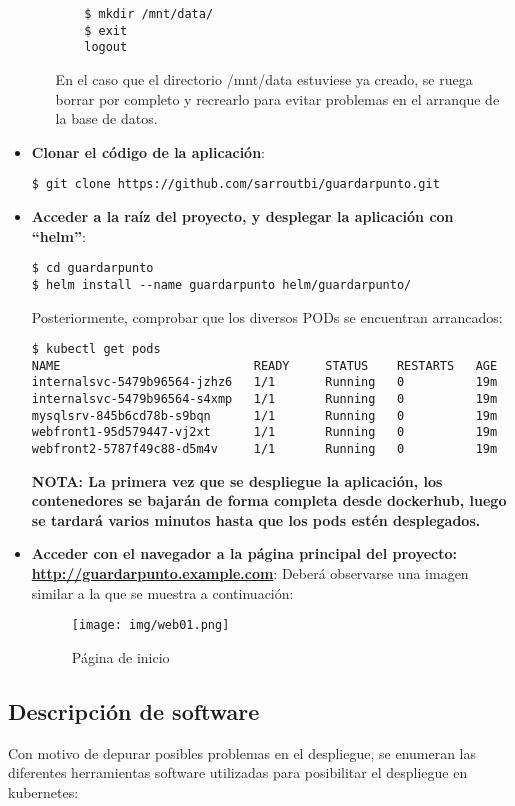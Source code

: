 \documentclass[12pt,spanish]{article}
\begin{document}
\begin{itemize}
\begin{itemize}
\begin{verbatim}
    $ mkdir /mnt/data/
    $ exit
    logout
  \end{verbatim}
  En el caso que el directorio /mnt/data estuviese ya creado, se ruega borrar por completo y recrearlo para evitar problemas en el arranque de la base de datos.
  \end{itemize}
\item{\textbf{Clonar el código de la aplicación}}:
\begin{verbatim}
$ git clone https://github.com/sarroutbi/guardarpunto.git
\end{verbatim}
\item{\textbf{Acceder a la raíz del proyecto, y desplegar la aplicación con ``helm''}}:
\begin{verbatim}
$ cd guardarpunto
$ helm install --name guardarpunto helm/guardarpunto/
\end{verbatim}
Posteriormente, comprobar que los diversos PODs se encuentran arrancados:
\begin{verbatim}
$ kubectl get pods
NAME                           READY     STATUS    RESTARTS   AGE
internalsvc-5479b96564-jzhz6   1/1       Running   0          19m
internalsvc-5479b96564-s4xmp   1/1       Running   0          19m
mysqlsrv-845b6cd78b-s9bqn      1/1       Running   0          19m
webfront1-95d579447-vj2xt      1/1       Running   0          19m
webfront2-5787f49c88-d5m4v     1/1       Running   0          19m
\end{verbatim}
\textbf{NOTA: La primera vez que se despliegue la aplicación, los contenedores se bajarán de forma completa desde dockerhub, luego se tardará varios minutos hasta que los pods estén desplegados.}
\item{\textbf{Acceder con el navegador a la página principal del proyecto: \url{http://guardarpunto.example.com}}}:
Deberá observarse una imagen similar a la que se muestra a continuación:
\begin{center}
 \begin{figure}[H]
 \begin{center}
   \texttt{[image: img/web01.png]}
   \caption{Página de inicio}
   \label{fig:initpage00}
 \end{center}
 \end{figure}
\end{center}

\end{itemize}

\subsection{Descripción de software}
Con motivo de depurar posibles problemas en el despliegue, se enumeran las diferentes herramientas software utilizadas para posibilitar el despliegue en kubernetes:
\end{document}
